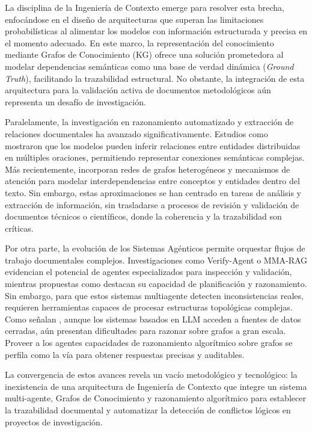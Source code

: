 \documentclass[12pt,letterpaper]{article}
\begin{document}
La disciplina de la Ingeniería de Contexto emerge para resolver esta brecha, enfocándose en el diseño de arquitecturas que superan las limitaciones probabilísticas al alimentar los modelos con información estructurada y precisa en el momento adecuado. En este marco, la representación del conocimiento mediante Grafos de Conocimiento \citep{Mohamed2025} (KG) ofrece una solución prometedora al modelar dependencias semánticas como una base de verdad dinámica (\textit{Ground Truth}), facilitando la trazabilidad estructural. No obstante, la integración de esta arquitectura para la validación activa de documentos metodológicos aún representa un desafío de investigación.

Paralelamente, la investigación en razonamiento automatizado y extracción de relaciones documentales ha avanzado significativamente. Estudios como \cite{Nan2020} mostraron que los modelos pueden inferir relaciones entre entidades distribuidas en múltiples oraciones, permitiendo representar conexiones semánticas complejas. Más recientemente, \citep{Li2022} incorporan redes de grafos heterogéneos y mecanismos de atención para modelar interdependencias entre conceptos y entidades dentro del texto. Sin embargo, estas aproximaciones se han centrado en tareas de análisis y extracción de información, sin trasladarse a procesos de revisión y validación de documentos técnicos o científicos, donde la coherencia y la trazabilidad son críticas.

Por otra parte, la evolución de los Sistemas Agénticos permite orquestar flujos de trabajo documentales complejos. Investigaciones como Verify-Agent \citep{Chu2024} o MMA-RAG \citep{Krayem2025} evidencian el potencial de agentes especializados para inspección y validación, mientras propuestas como \cite{Khamis2025} destacan su capacidad de planificación y razonamiento. Sin embargo, para que estos sistemas multiagente detecten inconsistencias reales, requieren herramientas capaces de procesar estructuras topológicas complejas. Como señalan \cite{Shi2025}, aunque los sistemas basados en LLM acceden a fuentes de datos cerradas, aún presentan dificultades para razonar sobre grafos a gran escala. Proveer a los agentes capacidades de razonamiento algorítmico sobre grafos se perfila como la vía para obtener respuestas precisas y auditables.

La convergencia de estos avances revela un vacío metodológico y tecnológico: la inexistencia de una arquitectura de Ingeniería de Contexto que integre un sistema multi-agente, Grafos de Conocimiento y razonamiento algorítmico para establecer la trazabilidad documental y automatizar la detección de conflictos lógicos en proyectos de investigación.
\end{document}
